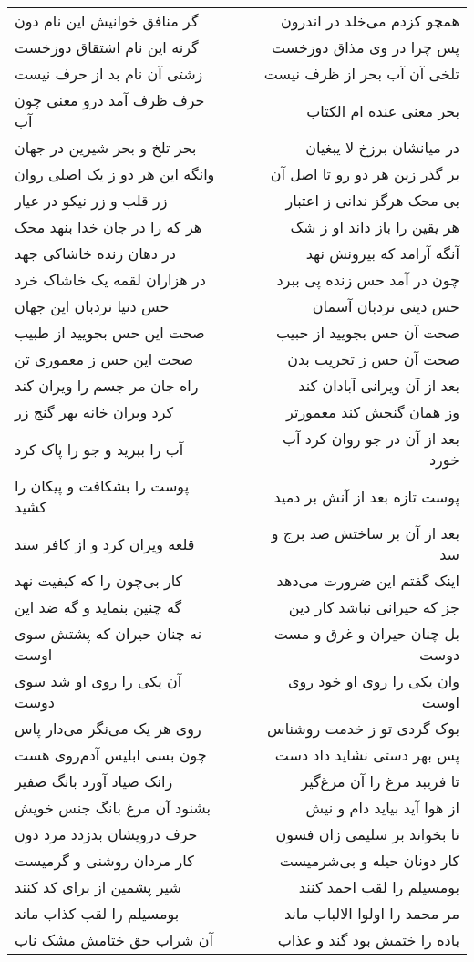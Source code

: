 \begin{center}
\begin{longtable}{l p{0.5cm} r}
گر منافق خوانیش این نام دون
&&
همچو کزدم می‌خلد در اندرون
\\
گرنه این نام اشتقاق دوزخست
&&
پس چرا در وی مذاق دوزخست
\\
زشتی آن نام بد از حرف نیست
&&
تلخی آن آب بحر از ظرف نیست
\\
حرف ظرف آمد درو معنی چون آب
&&
بحر معنی عنده ام الکتاب
\\
بحر تلخ و بحر شیرین در جهان
&&
در میانشان برزخ لا یبغیان
\\
وانگه این هر دو ز یک اصلی روان
&&
بر گذر زین هر دو رو تا اصل آن
\\
زر قلب و زر نیکو در عیار
&&
بی محک هرگز ندانی ز اعتبار
\\
هر که را در جان خدا بنهد محک
&&
هر یقین را باز داند او ز شک
\\
در دهان زنده خاشاکی جهد
&&
آنگه آرامد که بیرونش نهد
\\
در هزاران لقمه یک خاشاک خرد
&&
چون در آمد حس زنده پی ببرد
\\
حس دنیا نردبان این جهان
&&
حس دینی نردبان آسمان
\\
صحت این حس بجویید از طبیب
&&
صحت آن حس بجویید از حبیب
\\
صحت این حس ز معموری تن
&&
صحت آن حس ز تخریب بدن
\\
راه جان مر جسم را ویران کند
&&
بعد از آن ویرانی آبادان کند
\\
کرد ویران خانه بهر گنج زر
&&
وز همان گنجش کند معمورتر
\\
آب را ببرید و جو را پاک کرد
&&
بعد از آن در جو روان کرد آب خورد
\\
پوست را بشکافت و پیکان را کشید
&&
پوست تازه بعد از آنش بر دمید
\\
قلعه ویران کرد و از کافر ستد
&&
بعد از آن بر ساختش صد برج و سد
\\
کار بی‌چون را که کیفیت نهد
&&
اینک گفتم این ضرورت می‌دهد
\\
گه چنین بنماید و گه ضد این
&&
جز که حیرانی نباشد کار دین
\\
نه چنان حیران که پشتش سوی اوست
&&
بل چنان حیران و غرق و مست دوست
\\
آن یکی را روی او شد سوی دوست
&&
وان یکی را روی او خود روی اوست
\\
روی هر یک می‌نگر می‌دار پاس
&&
بوک گردی تو ز خدمت روشناس
\\
چون بسی ابلیس آدم‌روی هست
&&
پس بهر دستی نشاید داد دست
\\
زانک صیاد آورد بانگ صفیر
&&
تا فریبد مرغ را آن مرغ‌گیر
\\
بشنود آن مرغ بانگ جنس خویش
&&
از هوا آید بیاید دام و نیش
\\
حرف درویشان بدزدد مرد دون
&&
تا بخواند بر سلیمی زان فسون
\\
کار مردان روشنی و گرمیست
&&
کار دونان حیله و بی‌شرمیست
\\
شیر پشمین از برای کد کنند
&&
بومسیلم را لقب احمد کنند
\\
بومسیلم را لقب کذاب ماند
&&
مر محمد را اولوا الالباب ماند
\\
آن شراب حق ختامش مشک ناب
&&
باده را ختمش بود گند و عذاب
\\
\end{longtable}
\end{center}
